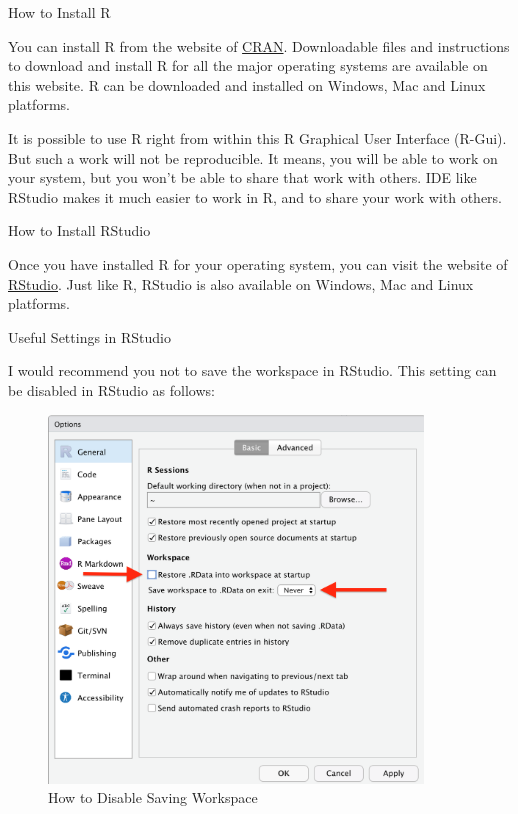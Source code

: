 \documentclass[
  letterpaper,
  paper =a4,
  twoside,
  openright,
  headsepline,
  footsepline,
  listof = totocnumbered,
  chapterprefix = true,
  firstiscover]{scrbook}
\begin{document}
How to Install R

You can install R from the website of
\href{https://cran.r-project.org/}{CRAN}. Downloadable files and
instructions to download and install R for all the major operating
systems are available on this website. R can be downloaded and installed
on Windows, Mac and Linux platforms.

It is possible to use R right from within this R Graphical User
Interface (R-Gui). But such a work will not be reproducible. It means,
you will be able to work on your system, but you won't be able to share
that work with others. IDE like RStudio makes it much easier to work in
R, and to share your work with others.

How to Install RStudio

Once you have installed R for your operating system, you can visit the
website of \href{https://posit.co/download/rstudio-desktop/}{RStudio}.
Just like R, RStudio is also available on Windows, Mac and Linux
platforms.

Useful Settings in RStudio

I would recommend you not to save the workspace in RStudio. This setting
can be disabled in RStudio as follows:

\begin{figure}[h]

{\centering \includegraphics[width=3.92in,height=\textheight]{images/RStudio-settings.png}

}

\caption{\label{fig-disable-workspace}How to Disable Saving Workspace}

\end{figure}
\end{document}
